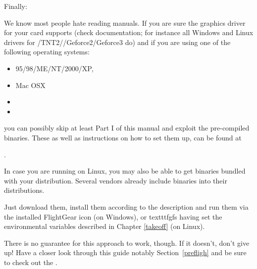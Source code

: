\noindent 
Finally:
\medskip


We know most people hate reading manuals. If you are sure the graphics driver for your card supports  (check documentation; for instance all  Windows and Linux drivers for /TNT2//Geforce2/Geforce3 do) and if you are using one of the following operating systems:

\begin{itemize}
\item {} 95/98/ME/NT/2000/XP,
\item {} Mac OSX
\item {}
\item {}
\end{itemize}

 \noindent
you can possibly skip at least Part I of this manual and exploit the pre-compiled binaries. These as well as instructions on how to set them up, can be found at
 \medskip

.
 \medskip

 \noindent
In case you are running \FlightGear{} on Linux, you may also be able to get binaries bundled with your distribution. Several vendors already include \FlightGear{} binaries into their distributions.
 
Just download them, install them according to the description and run them via the installed FlightGear icon (on Windows), or texttt{fgfs} having set the environmental variables described in Chapter \ref{takeoff} (on Linux).

There is no guarantee for this approach to work, though. If it doesn't, don't give up! Have a closer look through this guide notably Section~\ref{prefligh} and be sure to check out the .


